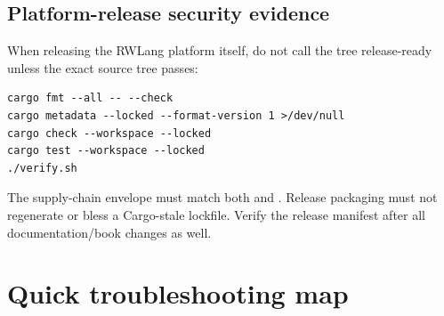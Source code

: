 \subsection*{Platform-release security evidence}

When releasing the RWLang platform itself, do not call the tree release-ready unless the exact source tree passes:

\begin{lstlisting}
cargo fmt --all -- --check
cargo metadata --locked --format-version 1 >/dev/null
cargo check --workspace --locked
cargo test --workspace --locked
./verify.sh
\end{lstlisting}

The supply-chain envelope must match both  and . Release packaging must not regenerate or bless a Cargo-stale lockfile. Verify the release manifest after all documentation/book changes as well.

\section{Quick troubleshooting map}

